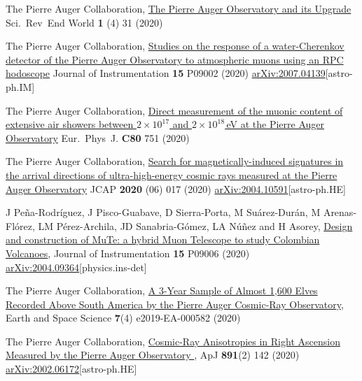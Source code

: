 \begin{etaremune}
\item {}The Pierre Auger Collaboration, \href{https://doi.org/10.52712/sciencereviews.v1i4.31}{The Pierre Auger Observatory and its Upgrade} Sci.\ Rev\  End World {\textbf{1}} (4) 31 (2020)

\item {}The Pierre Auger Collaboration, \href{https://doi.org/10.1088/1748-0221/15/09/P09002}{Studies on the response of a water-Cherenkov detector of the Pierre Auger Observatory to atmospheric muons using an RPC hodoscope} Journal of Instrumentation {\textbf{15}} P09002 (2020) \href{https://arxiv.org/abs/2007.04139}{arXiv:2007.04139}[astro-ph.IM]

\item {}The Pierre Auger Collaboration, \href{https://doi.org/10.1140/epjc/s10052-020-8055-y}{Direct measurement of the muonic content of extensive air showers between $2\times 10^{17}$ and $2\times 10^{18}$\,eV at the Pierre Auger Observatory} Eur.\ Phys\  J. {\textbf{C80}} 751 (2020)


\item {}The Pierre Auger Collaboration, \href{https://doi.org/10.1088/1475-7516/2020/06/017}{Search for magnetically-induced signatures in the arrival directions of ultra-high-energy cosmic rays measured at the Pierre Auger Observatory} JCAP {\textbf{2020}} (06) 017 (2020) \href{https://arxiv.org/abs/2004.10591}{arXiv:2004.10591}[astro-ph.HE]

\item {} J Peña-Rodríguez, J Pisco-Guabave, D Sierra-Porta, M Suárez-Durán, M Arenas-Flórez, LM Pérez-Archila, JD Sanabria-Gómez, LA Núñez and H Asorey, \href{https://doi.org/10.1088/1748-0221/15/09/P09006}{{Design and construction of MuTe: a hybrid Muon Telescope to study Colombian Volcanoes}}, Journal of Instrumentation {\textbf{15}} P09006 (2020) \href{https://arxiv.org/abs/2004.09364}{arXiv:2004.09364}[physics.ins-det]

\item {}The Pierre Auger Collaboration, \href{https://doi.org/10.1029/2019EA000582}{A 3-Year Sample of Almost 1,600 Elves Recorded Above South America by the Pierre Auger Cosmic-Ray Observatory}, Earth and Space Science {\textbf{7}}(4) e2019-EA-000582 (2020) %

\item {}The Pierre Auger Collaboration, \href{https://doi.org/10.3847/1538-4357/ab7236}{{Cosmic-Ray Anisotropies in Right Ascension Measured by the Pierre Auger Observatory
}}, ApJ {\textbf{891}}(2) 142 (2020) \href{https://arxiv.org/abs/2002.06172}{arXiv:2002.06172}[astro-ph.HE]


\end{etaremune}
